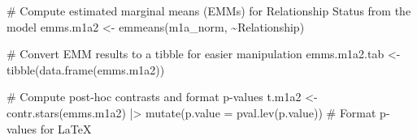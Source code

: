 \documentclass[
  bookmarksnumbered]{article}
\newenvironment{Shaded}{\begin{snugshade}}{\end{snugshade}}
\newcommand{\AttributeTok}[1]{\textcolor[rgb]{0.80,0.80,0.80}{#1}}
\newcommand{\CommentTok}[1]{\textcolor[rgb]{0.50,0.62,0.50}{#1}}
\newcommand{\FunctionTok}[1]{\textcolor[rgb]{0.94,0.94,0.56}{#1}}
\newcommand{\NormalTok}[1]{\textcolor[rgb]{0.80,0.80,0.80}{#1}}
\newcommand{\OtherTok}[1]{\textcolor[rgb]{0.94,0.94,0.56}{#1}}
\newcommand{\SpecialCharTok}[1]{\textcolor[rgb]{0.86,0.64,0.64}{#1}}
\begin{document}
\begin{Shaded}
\begin{Highlighting}[]
\CommentTok{\# Compute estimated marginal means (EMMs) for Relationship Status from the model}
\NormalTok{emms.m1a2 }\OtherTok{\textless{}{-}} \FunctionTok{emmeans}\NormalTok{(m1a\_norm, }\SpecialCharTok{\textasciitilde{}}\NormalTok{Relationship)}

\CommentTok{\# Convert EMM results to a tibble for easier manipulation}
\NormalTok{emms.m1a2.tab }\OtherTok{\textless{}{-}} \FunctionTok{tibble}\NormalTok{(}\FunctionTok{data.frame}\NormalTok{(emms.m1a2))}

\CommentTok{\# Compute post{-}hoc contrasts and format p{-}values}
\NormalTok{t.m1a2 }\OtherTok{\textless{}{-}} \FunctionTok{contr.stars}\NormalTok{(emms.m1a2) }\SpecialCharTok{|\textgreater{}}
  \FunctionTok{mutate}\NormalTok{(}\AttributeTok{p.value =} \FunctionTok{pval.lev}\NormalTok{(p.value)) }\CommentTok{\# Format p{-}values for LaTeX}


\end{Highlighting}
\end{Shaded}
\end{document}
